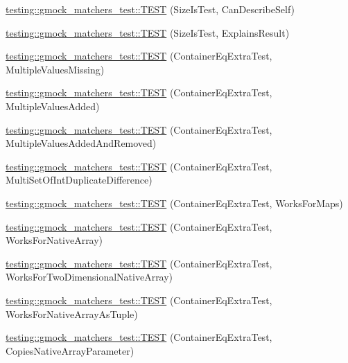 \begin{DoxyCompactItemize}
\item 
\hyperlink{namespacetesting_1_1gmock__matchers__test_adc9720306de1626aa7e523637ca64dfa}{testing\+::gmock\+\_\+matchers\+\_\+test\+::\+T\+E\+ST} (Size\+Is\+Test, Can\+Describe\+Self)
\item 
\hyperlink{namespacetesting_1_1gmock__matchers__test_a6c218845fd345302c490ef53f0d36995}{testing\+::gmock\+\_\+matchers\+\_\+test\+::\+T\+E\+ST} (Size\+Is\+Test, Explains\+Result)
\item 
\hyperlink{namespacetesting_1_1gmock__matchers__test_ab84ac6cfde20f21ed69d5d7aa882ea1b}{testing\+::gmock\+\_\+matchers\+\_\+test\+::\+T\+E\+ST} (Container\+Eq\+Extra\+Test, Multiple\+Values\+Missing)
\item 
\hyperlink{namespacetesting_1_1gmock__matchers__test_acc28beb0f3d3fbd8923bad7eb08ce6a6}{testing\+::gmock\+\_\+matchers\+\_\+test\+::\+T\+E\+ST} (Container\+Eq\+Extra\+Test, Multiple\+Values\+Added)
\item 
\hyperlink{namespacetesting_1_1gmock__matchers__test_acb0d845f828c2d5a551e4db0611f2853}{testing\+::gmock\+\_\+matchers\+\_\+test\+::\+T\+E\+ST} (Container\+Eq\+Extra\+Test, Multiple\+Values\+Added\+And\+Removed)
\item 
\hyperlink{namespacetesting_1_1gmock__matchers__test_a6bce9564bb713ffb690b776e35d2e6cf}{testing\+::gmock\+\_\+matchers\+\_\+test\+::\+T\+E\+ST} (Container\+Eq\+Extra\+Test, Multi\+Set\+Of\+Int\+Duplicate\+Difference)
\item 
\hyperlink{namespacetesting_1_1gmock__matchers__test_ab7bcbeeeb23094cff6f2882304c05134}{testing\+::gmock\+\_\+matchers\+\_\+test\+::\+T\+E\+ST} (Container\+Eq\+Extra\+Test, Works\+For\+Maps)
\item 
\hyperlink{namespacetesting_1_1gmock__matchers__test_ae5e5420340c8cf91d24af11feca669b0}{testing\+::gmock\+\_\+matchers\+\_\+test\+::\+T\+E\+ST} (Container\+Eq\+Extra\+Test, Works\+For\+Native\+Array)
\item 
\hyperlink{namespacetesting_1_1gmock__matchers__test_a3cf0d2f2c08e34ca0b7e11ff27b4a7ca}{testing\+::gmock\+\_\+matchers\+\_\+test\+::\+T\+E\+ST} (Container\+Eq\+Extra\+Test, Works\+For\+Two\+Dimensional\+Native\+Array)
\item 
\hyperlink{namespacetesting_1_1gmock__matchers__test_a94e4a2a02cde84ac51e37cda1813bc77}{testing\+::gmock\+\_\+matchers\+\_\+test\+::\+T\+E\+ST} (Container\+Eq\+Extra\+Test, Works\+For\+Native\+Array\+As\+Tuple)
\item 
\hyperlink{namespacetesting_1_1gmock__matchers__test_af7a978384d567d133240fb1899ec1658}{testing\+::gmock\+\_\+matchers\+\_\+test\+::\+T\+E\+ST} (Container\+Eq\+Extra\+Test, Copies\+Native\+Array\+Parameter)

\end{DoxyCompactItemize}
